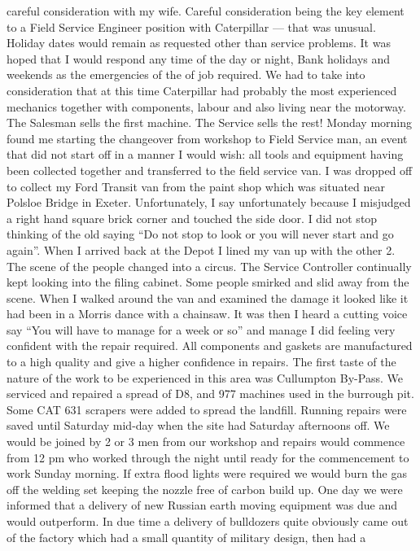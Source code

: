 careful consideration with my wife. Careful consideration being the key
element to a Field Service Engineer position with Caterpillar --- that was
unusual. Holiday dates would remain as requested other than service problems.
It was hoped that I would respond any time of the day or night, Bank holidays
and weekends as the emergencies of the of job required. We had to take into
consideration that at this time Caterpillar had probably the most experienced
mechanics together with components, labour and also living near the motorway.
The Salesman sells the first machine. The Service sells the rest! Monday
morning found me starting the changeover from workshop to Field Service man, an
event that did not start off in a manner I would wish: all tools and equipment
having been collected together and transferred to the field service van. I was
dropped off to collect my Ford Transit van from the paint shop which was
situated near Polsloe Bridge in Exeter. Unfortunately, I say unfortunately
because I misjudged a right hand square brick corner and touched the side door.
I did not stop thinking of the old saying ``Do not stop to look or you will
never start and go again''. When I arrived back at the Depot I lined my van up
with the other 2. The scene of the people changed into a circus. The Service
Controller continually kept looking into the filing cabinet. Some people
smirked and slid away from the scene. When I walked around the van and
examined the damage it looked like it had been in a Morris dance with a
chainsaw. It was then I heard a cutting voice say ``You will have to manage
for a week or so'' and manage I did feeling very confident with the repair
required. All components and gaskets are manufactured to a high quality and
give a higher confidence in repairs. The first taste of the nature of the work
to be experienced in this area was Cullumpton By-Pass. We serviced and
repaired a spread of D8, and 977 machines used in the burrough       pit.
Some CAT 631 scrapers were added to spread the landfill. Running repairs were
saved until Saturday mid-day when the site had Saturday afternoons off. We
would be joined by 2 or 3 men from our workshop and repairs would commence from
12 pm who worked through the night until ready for the commencement to work
Sunday morning. If extra flood lights were required we would burn the gas
off the welding set keeping the nozzle free of carbon build up. One day we
were informed that a delivery of new Russian earth moving equipment was due and
would outperform. In due time a delivery of bulldozers quite obviously came
out of the factory which had a small quantity of military design, then had a

